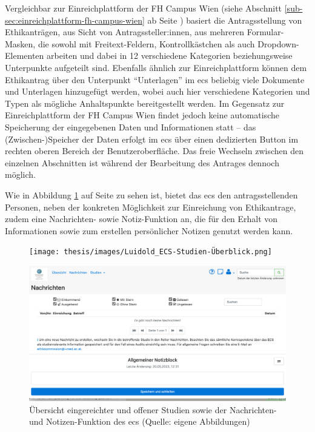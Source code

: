 \documentclass[a4paper,12pt,twoside]{scrreprt}
\begin{document}
\medskip

Vergleichbar zur Einreichplattform der FH Campus Wien (siehe Abschnitt \ref{sub-sec:einreichplattform-fh-campus-wien} ab Seite \pageref{sub-sec:einreichplattform-fh-campus-wien}) basiert die Antragsstellung von Ethikanträgen, aus Sicht von Antragssteller:innen, aus mehreren Formular-Masken, die sowohl mit Freitext-Feldern, Kontrollkästchen als auch Dropdown-Elementen arbeiten und dabei in 12 verschiedene Kategorien beziehungsweise Unterpunkte aufgeteilt sind. Ebenfalls ähnlich zur Einreichplattform können dem Ethikantrag über den Unterpunkt \enquote{Unterlagen} im \ac{ecs} beliebig viele Dokumente und Unterlagen hinzugefügt werden, wobei auch hier verschiedene Kategorien und Typen als mögliche Anhaltspunkte bereitgestellt werden. Im Gegensatz zur Einreichplattform der FH Campus Wien findet jedoch keine automatische Speicherung der eingegebenen Daten und Informationen statt -- das (Zwischen-)Speicher der Daten erfolgt im \ac{ecs} über einen dedizierten Button im rechten oberen Bereich der Benutzeroberfläche. Das freie Wechseln zwischen den einzelnen Abschnitten ist während der Bearbeitung des Antrages dennoch möglich.

Wie in Abbildung \ref{fig:ecs-studien-nachrichten-notizen} auf Seite \pageref{fig:ecs-studien-nachrichten-notizen} zu sehen ist, bietet das \ac{ecs} den antragsstellenden Personen, neben der konkreten Möglichkeit zur Einreichung von Ethikantrage, zudem eine Nachrichten- sowie Notiz-Funktion an, die für den Erhalt von Informationen sowie zum erstellen persönlicher Notizen genutzt werden kann.

\begin{figure}[ht!]
    \centering
    \begin{minipage}[t]{.85\linewidth}
        \texttt{[image: thesis/images/Luidold\_ECS-Studien-Überblick.png]}
    \end{minipage}
    \begin{minipage}[b]{.85\linewidth}
        \includegraphics[width=\linewidth]{thesis/images/Luidold_ECS-Nachrichten-Notizen.png}
    \end{minipage}
    \caption[Übersicht eingereichter und offener Studien (oben) sowie der Nachrichten- und Notizen-Funktion (unten) des \acl{ecs}]{Übersicht eingereichter und offener Studien sowie der Nachrichten- und Notizen-Funktion des \acl{ecs} (Quelle: eigene Abbildungen)}
    \label{fig:ecs-studien-nachrichten-notizen}
\end{figure}
\end{document}
